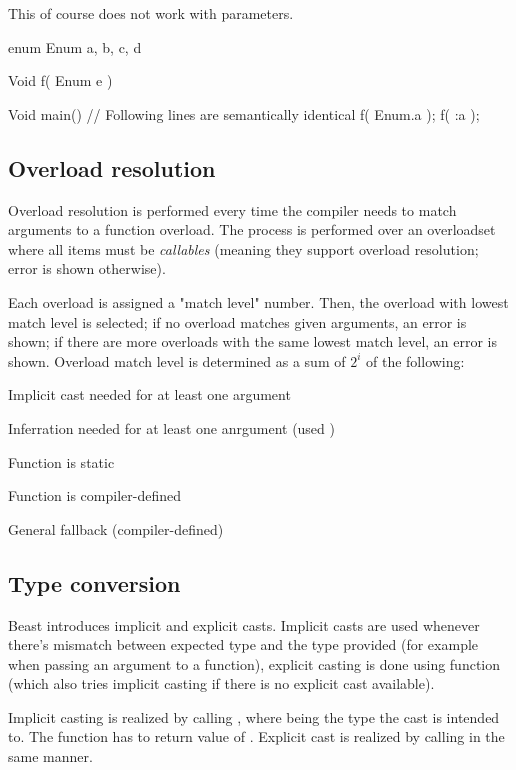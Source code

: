 This of course does not work with  parameters.

\begin{code}
enum Enum {
	a, b, c, d
}

Void f( Enum e ) {}

Void main() {
	// Following lines are semantically identical
	f( Enum.a );
	f( :a );	
}
\end{code}

\subsection{Overload resolution} \label{overloadResolution}
Overload resolution is performed every time the compiler needs to match arguments to a function overload. The process is performed over an overloadset where all items must be \textit{callables} (meaning they support overload resolution; error is shown otherwise).

Each overload is assigned a "match level" number. Then, the overload with lowest match level is selected; if no overload matches given arguments, an error is shown; if there are more overloads with the same lowest match level, an error is shown. Overload match level is determined as a sum of $2^i$ of the following:

\begin{compactenum}
	\item Implicit cast needed for at least one argument
	\item Inferration needed for at least one anrgument (used )
	\item Function is static
	\item Function is compiler-defined
	\item General fallback (compiler-defined)
\end{compactenum}

\subsection{Type conversion} \label{typeConversion}
Beast introduces implicit and explicit casts. Implicit casts are used whenever there's mismatch between expected type and the type provided (for example when passing an argument to a function), explicit casting is done using function  (which also tries implicit casting if there is no explicit cast available).

Implicit casting is realized by calling , where  being the type the cast is intended to. The function has to return value of . Explicit cast is realized by calling  in the same manner.

